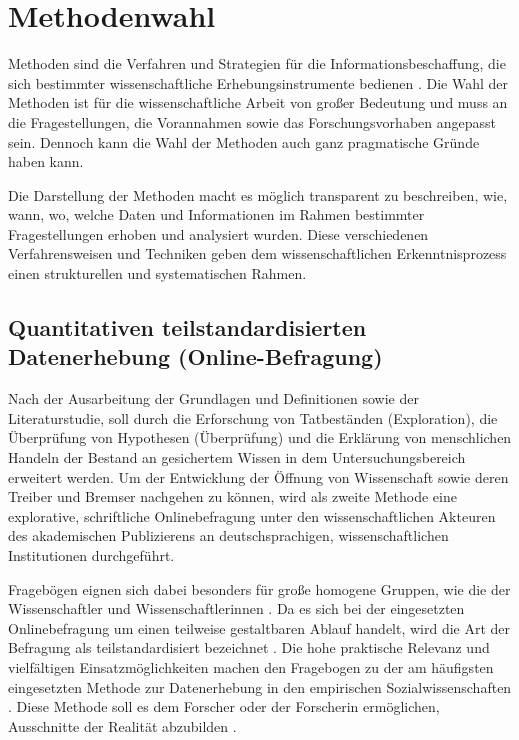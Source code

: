 \section{Methodenwahl}

Methoden sind die Verfahren und Strategien für die Informationsbeschaffung, die sich bestimmter wissenschaftliche Erhebungsinstrumente bedienen \cite[:309]{kromrey2013empirische}. Die Wahl der Methoden ist für die wissenschaftliche Arbeit von großer Bedeutung und muss an die Fragestellungen, die Vorannahmen sowie das Forschungsvorhaben angepasst sein. Dennoch kann die Wahl der Methoden auch ganz pragmatische Gründe haben kann.

Die Darstellung der Methoden macht es möglich transparent zu beschreiben, wie, wann, wo, welche Daten und Informationen im Rahmen bestimmter Fragestellungen erhoben und analysiert wurden. Diese verschiedenen Verfahrensweisen und Techniken geben dem wissenschaftlichen Erkenntnisprozess einen strukturellen und systematischen Rahmen.

\subsection{Quantitativen teilstandardisierten Datenerhebung (Online-Befragung)}

Nach der Ausarbeitung der Grundlagen und Definitionen sowie der Literaturstudie, soll durch die Erforschung von Tatbeständen (Exploration), die Überprüfung von Hypothesen (Überprüfung) \cite{raab_2012_fragebogen} und die Erklärung von menschlichen Handeln \cite{atteslander_2008_methoden} der Bestand an gesichertem Wissen in dem Untersuchungsbereich erweitert \cite{bortz_Doering_2006_fragestellung} werden. Um der Entwicklung der Öffnung von Wissenschaft sowie deren Treiber und Bremser nachgehen zu können, wird als zweite Methode eine explorative, schriftliche Onlinebefragung unter den wissenschaftlichen Akteuren des akademischen Publizierens an deutschsprachigen, wissenschaftlichen Institutionen durchgeführt.

Fragebögen eignen sich dabei besonders für große homogene Gruppen, wie die der Wissenschaftler und Wissenschaftlerinnen \cite{suchen}. Da es sich bei der eingesetzten Onlinebefragung um einen teilweise gestaltbaren Ablauf handelt, wird die Art der Befragung als teilstandardisiert bezeichnet \cite{raab_2012_fragebogen}. Die hohe praktische Relevanz und vielfältigen Einsatzmöglichkeiten machen den Fragebogen zu der am häufigsten eingesetzten Methode zur Datenerhebung in den empirischen Sozialwissenschaften \cite{raab_2012_fragebogen}. Diese Methode soll es dem Forscher oder der Forscherin ermöglichen, Ausschnitte der Realität abzubilden \cite{raab_2012_fragebogen}.

